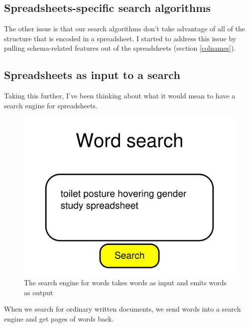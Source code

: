 \documentclass{acm_proc_article-sp}
\begin{document}
\subsection{Spreadsheets-specific search algorithms}
The other issue is that our search algorithms don't take advantage of all
of the structure that is encoded in a spreadsheet.
I started to address this issue by pulling schema-related features out
of the spreadsheets (section \ref{colnames}).

\subsection{Spreadsheets as input to a search}
Taking this further, I've been thinking
about what it would mean to have a search engine for spreadsheets.

\begin{figure}
\includegraphics[width=\columnwidth]{../pagerank-for-spreadsheets/wordsearch.png}
\caption{The search engine for words takes words as input and emits words as output}
\centering
\end{figure}

When we search for ordinary written documents, we send words into a search
engine and get pages of words back.
\end{document}
